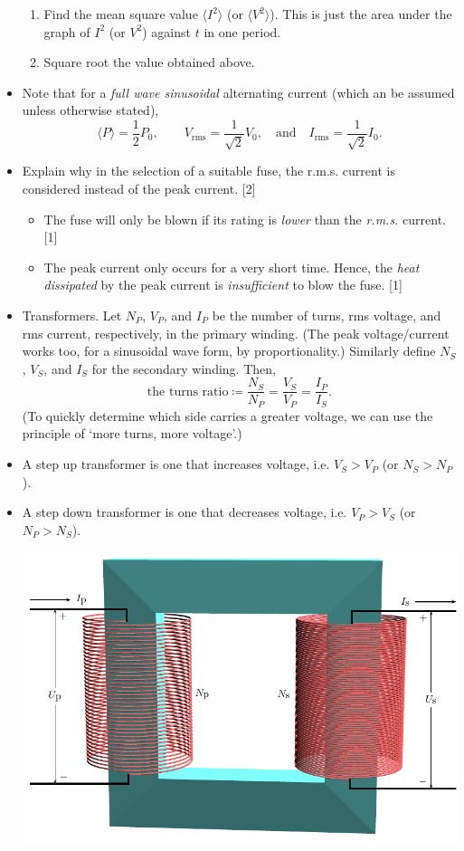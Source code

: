 \documentclass[oneside]{book}
\begin{document}
\begin{itemize}
\begin{enumerate}
        \item Find the mean square value \(\langle I^2 \rangle\) (or \(\langle V^2 \rangle\)). This is just the area under the graph of \(I^2\) (or \(V^2\)) against \(t\) in one period.
        \item Square root the value obtained above.
    \end{enumerate}
    \item Note that for a \emph{full wave sinusoidal} alternating current (which an be assumed unless otherwise stated), 
    \[\langle P \rangle=\frac{1}{2}P_0,\qquad V_{\text{rms}}=\frac{1}{\sqrt{2}}V_0,\quad\text{and}\quad I_{\text{rms}}=\frac{1}{\sqrt{2}}I_0.\]
    \item Explain why in the selection of a suitable fuse, the r.m.s. current is considered instead of the peak current. \hspace*{\fill} [2]
    \begin{itemize}
        \item The fuse will only be blown if its rating is \emph{lower} than the \emph{r.m.s.} current. \hspace*{\fill} [1]
        \item The peak current only occurs for a very short time. Hence, the \emph{heat dissipated} by the peak current is \emph{insufficient} to blow the fuse. \hspace*{\fill} [1]
    \end{itemize}
    \item Transformers. Let \(N_P\), \(V_P\), and \(I_P\) be the number of turns, rms voltage, and rms current, respectively, in the primary winding. (The peak voltage/current works too, for a sinusoidal wave form, by proportionality.) Similarly define \(N_S\), \(V_S\), and \(I_S\) for the secondary winding. Then,
    \[\text{the turns ratio}\coloneq\frac{N_S}{N_P}=\frac{V_S}{V_P}=\frac{I_P}{I_S}.\]
    (To quickly determine which side carries a greater voltage, we can use the principle of `more turns, more voltage'.)
    \item A step up transformer is one that increases voltage, i.e. \(V_S>V_P\) (or \(N_S>N_P\)).
    \item A step down transformer is one that decreases voltage, i.e. \(V_P>V_S\) (or \(N_P>N_S\)).
    \begin{center}
        \includegraphics[width=\textwidth-30pt]{../images/Transformer/TransformerCropped.pdf}

\end{center}
\end{itemize}
\end{document}
